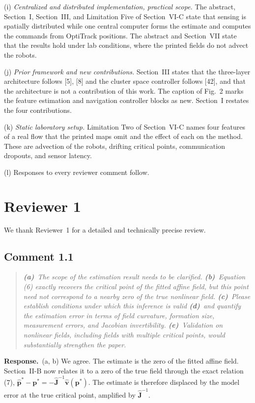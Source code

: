 \documentclass[10pt]{article}
\newcommand{\resp}{\par\textbf{Response.}~}
\begin{document}
(i) \emph{Centralized and distributed implementation, practical scope.} The abstract, Section~I, Section~III, and Limitation Five of Section~VI-C state that sensing is spatially distributed while one central computer forms the estimate and computes the commands from OptiTrack positions. The abstract and Section~VII state that the results hold under lab conditions, where the printed fields do not advect the robots.

(j) \emph{Prior framework and new contributions.} Section~III states that the three-layer architecture follows [5], [8] and the cluster space controller follows [42], and that the architecture is not a contribution of this work. The caption of Fig.~2 marks the feature estimation and navigation controller blocks as new. Section~I restates the four contributions.

(k) \emph{Static laboratory setup.} Limitation Two of Section~VI-C names four features of a real flow that the printed maps omit and the effect of each on the method. These are advection of the robots, drifting critical points, communication dropouts, and sensor latency.

(l) Responses to every reviewer comment follow.

\section*{Reviewer 1}
We thank Reviewer~1 for a detailed and technically precise review.

\subsection*{Comment 1.1}

\begin{quote}\itshape
\textbf{(a)}~The scope of the estimation result needs to be clarified.
\textbf{(b)}~Equation (6) exactly recovers the critical point of the fitted affine field, but this point need not correspond to a nearby zero of the true nonlinear field.
\textbf{(c)}~Please establish conditions under which this inference is valid
\textbf{(d)}~and quantify the estimation error in terms of field curvature, formation size, measurement errors, and Jacobian invertibility.
\textbf{(e)}~Validation on nonlinear fields, including fields with multiple critical points, would substantially strengthen the paper.
\end{quote}


\resp (a, b) We agree. The estimate is the zero of the fitted affine field. Section~II-B now relates it to a zero of the true field through the exact relation (7), $\hat{\mathbf{p}}^* - \mathbf{p}^* = -\hat{\mathbf{J}}^{-1}\hat{\mathbf{v}}(\mathbf{p}^*)$. The estimate is therefore displaced by the model error at the true critical point, amplified by $\hat{\mathbf{J}}^{-1}$.
\end{document}
